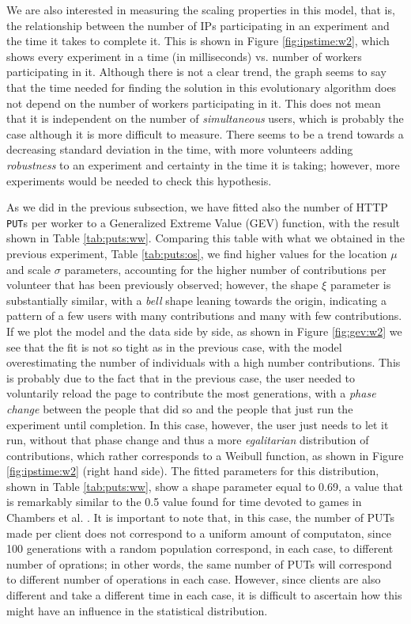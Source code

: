 \documentclass[journal,onecolumn]{IEEEtran}
\begin{document}
%
We are also interested in measuring the scaling properties in this
model, that is, the relationship between the number of IPs
participating in an experiment and the time it takes to complete
it. This is shown in Figure \ref{fig:ipstime:w2}, which shows every
experiment in a time (in milliseconds) vs. number of workers participating
in it. Although there is not a clear trend, the graph seems to say
that the time needed for finding the solution in this evolutionary
algorithm does not depend on the number of workers participating in
it. This does not mean that it is independent on the number of {\em
  simultaneous} users, which is probably the case although it is more
difficult to measure. There seems to be a trend towards a decreasing
standard deviation in the time, with more volunteers adding {\em
  robustness} to an experiment and certainty in the time it is taking;
however, more experiments would be needed to check this hypothesis.

As we did in the previous subsection, we have fitted also the number
of HTTP {\tt PUT}s per worker to a  Generalized Extreme Value (GEV) function, with the result shown
in Table \ref{tab:puts:ww}. Comparing this table with what we obtained
in the previous experiment, Table \ref{tab:puts:os}, we find higher values
for the location $\mu$ and scale $\sigma$ parameters, accounting for
the higher number of contributions per volunteer that has been
previously observed; however, the shape $\xi$ parameter is
substantially similar, with a {\em bell} shape leaning towards the
origin, indicating a pattern of a few users with many contributions
and many with few contributions. If we plot the model and the data
side by side, as shown in Figure \ref{fig:gev:w2} we see that the fit
is not so tight as in the previous case, with the model overestimating
the number of individuals with a high number contributions. This is
probably due to the fact that in the previous case, the user needed to
voluntarily reload the page to contribute the most generations, with a
{\em phase change} between the people that did so and the people that
just run the experiment until completion. In this case, however, the
user just needs to let it run, without that phase change and thus a
more {\em egalitarian} distribution of contributions, which rather
corresponds to a Weibull function, as shown in Figure
\ref{fig:ipstime:w2} (right hand side). The fitted parameters for this
distribution, shown in Table \ref{tab:puts:ww}, show a shape parameter
equal to 0.69, a value that is remarkably similar to the 0.5 value
found for time devoted to games in Chambers et
al. \cite{chambers2005measurement}. It is important to note that, in
this case, the number of PUTs made per client does not correspond to a
uniform amount of computaton, since 100 generations with a random
population correspond, in each case, to different number of
oprations; in other words, the same number of PUTs will correspond to
different number of operations in each case. However, since clients
are also different and take a different time in each case, it is
difficult to ascertain how this might have an influence in the
statistical distribution.
\end{document}
